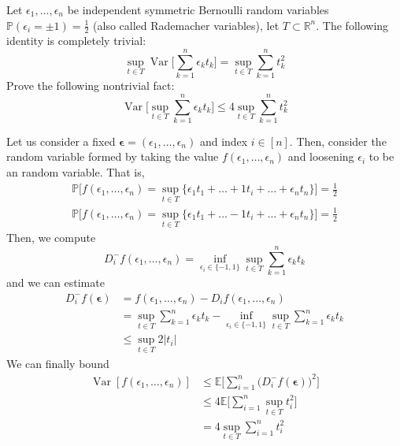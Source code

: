 \documentclass{article}
\DeclareMathOperator{\Var}{Var}
\begin{document}
  \begin{exercise}
  Let $\epsilon_1, \ldots, \epsilon_n$ be independent symmetric Bernoulli random variables $\mathbb{P}(\epsilon_i = \pm 1) = \frac{1}{2}$ (also called Rademacher variables), let $T \subset \mathbb{R}^n$. The following identity is completely trivial: 
  \[\sup_{t \in T} \Var \bigg[ \sum_{k=1}^n \epsilon_k t_k \bigg] = \sup_{t \in T} \sum_{k=1}^n t_k^2\]
  Prove the following nontrivial fact: 
  \[\Var \bigg[ \sup_{t \in T} \sum_{k=1}^n \epsilon_k t_k \bigg] \leq 4 \sup_{t \in T} \sum_{k=1}^n t_k^2\]
  \end{exercise}
  \begin{solution}
  Let us consider a fixed $\boldsymbol{\epsilon} = (\epsilon_1, \ldots, \epsilon_n)$ and index $i \in [n]$. Then, consider the random variable formed by taking the value $f(\epsilon_1, \ldots, \epsilon_n)$ and loosening $\epsilon_i$ to be an random variable. That is, 
  \begin{align*}
      \mathbb{P} \Big[ f(\epsilon_1, \ldots, \epsilon_n) = \sup_{t \in T} \{\epsilon_1 t_1 + \ldots + 1 t_i + \ldots + \epsilon_n t_n\} \Big] = \frac{1}{2} \\
      \mathbb{P} \Big[ f(\epsilon_1, \ldots, \epsilon_n) = \sup_{t \in T} \{\epsilon_1 t_1 + \ldots - 1 t_i + \ldots + \epsilon_n t_n\} \Big] = \frac{1}{2} 
  \end{align*}
  Then, we compute 
  \[D_i^- f (\epsilon_1, \ldots, \epsilon_n) = \inf_{\epsilon_i \in \{-1, 1\}} \sup_{t \in T} \sum_{k=1}^n \epsilon_k t_k\]
  and we can estimate 
  \begin{align*}
      D_i^- f(\boldsymbol{\epsilon}) & = f(\epsilon_1, \ldots, \epsilon_n) - D_i f (\epsilon_1, \ldots, \epsilon_n) \\
      & = \sup_{t \in T} \sum_{k=1}^n \epsilon_k t_k - \inf_{\epsilon_i \in \{-1, 1\}} \sup_{t \in T} \sum_{k=1}^n \epsilon_k t_k \\
      & \leq \sup_{t \in T} 2 |t_i| 
  \end{align*}
  We can finally bound 
  \begin{align*}
      \Var[ f(\epsilon_1, \ldots, \epsilon_n)] & \leq \mathbb{E} \bigg[ \sum_{i=1}^n \big( D_i^- f(\boldsymbol{\epsilon})\big)^2 \bigg] \\
      & \leq 4 \mathbb{E} \bigg[ \sum_{i=1}^n \sup_{t \in T} t_i^2 \bigg] \\
      & = 4 \sup_{t \in T} \sum_{i=1}^n t_i^2 
  \end{align*}
  \end{solution}
\end{document}
